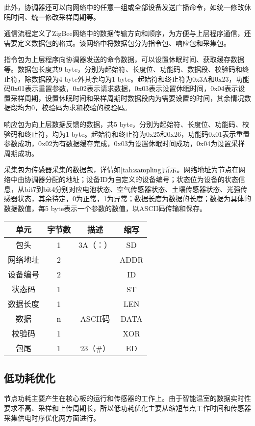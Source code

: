 此外，协调器还可以向网络中的任意一组或全部设备发送广播命令，如统一修改休眠时间、统一修改采样周期等。

通信流程定义了ZigBee网络中的数据传输方向和顺序，为方便与上层程序通信，还需要定义数据包的格式。该网络中将数据包分为指令包、响应包和采集包。

指令包为上层程序向协调器发送的命令数据，可以设置休眠时间、获取缓存数据等。数据包长度共9 byte，分别为起始符、长度位、功能码、数据段、校验码和终止符，除数据段为4 byte外其余均为1 byte。起始符和终止符为0x3A和0x23，功能码0x01表示重置参数，0x02表示请求数据，0x03表示设置休眠时间，0x04表示设置采样周期，设置休眠时间和采样周期时数据段内为需要设置的时间，其余情况数据段均为0，校验码为求和校验的校验码。

响应包为向上层数据反馈的数据，共5 byte，分别为起始符、长度位、功能码、校验码和终止符，均为1 byte。起始符和终止符为0x25和0x26，功能码0x01表示重置参数成功，0x02为有数据缓存完成，0x03为设置休眠时间成功，0x04为设置采样周期成功。

采集包为传感器采集的数据包，详情如\ref{tab:sampling}所示。网络地址为节点在网络中由协调器分配的地址；设备ID为自定义的设备编号；状态位为设备的状态信息，从bit7到bit4分别对应电池状态、空气传感器状态、土壤传感器状态、光强传感器状态，其余待定，0为正常，1为异常；数据长度为数据的长度；数据为具体的数据数值，每5 byte表示一个参数的数值，以ASCII码传输和保存。
		\begin{table}[!hpb]
  			\centering
  			\begin{tabular}{cccc} \toprule
			单元 & 	字节数 & 	描述 & 	缩写\\ \midrule
			包头 & 	1 & 	3A（：）	 & SD\\
			网络地址 & 	2 & 	 & 	ADDR\\
			设备编号 & 	2 & 	 & 	ID\\
			状态码	 & 1	 & &  	ST\\
			数据长度	 & 1	 &  & 	LEN\\
			数据 & 	n & 	ASCII码 & 	DATA\\
			校验码	& 1	 &  & 	XOR\\
			包尾	& 1	 & 23（\#） & 	ED\\ \bottomrule
 			\end{tabular}
		\end{table}
		
	\subsection{低功耗优化}
	节点功耗主要产生在核心板的运行和传感器的工作上。由于智能温室的数据实时性要求不高、采样和上传周期长，所以低功耗优化主要从缩短节点工作时间和传感器采集供电时序优化两方面进行。
	
